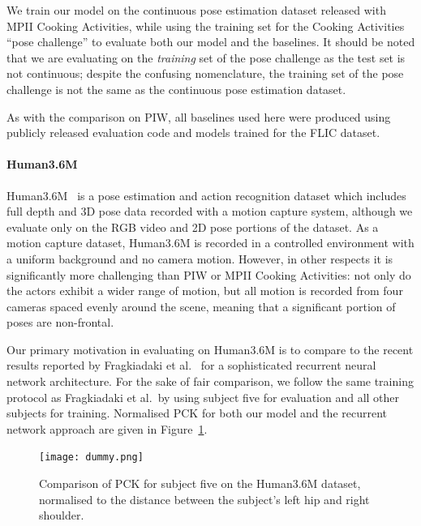 \documentclass[runningheads]{llncs}
\begin{document}
We train our model on the continuous pose estimation dataset released with MPII
Cooking Activities, while using the training set for the Cooking Activities
``pose challenge'' to evaluate both our model and the baselines. It should be
noted that we are evaluating on the \textit{training} set of the pose challenge
as the test set is not continuous; despite the confusing nomenclature, the
training set of the pose challenge is not the same as the continuous pose
estimation dataset.

As with the comparison on PIW, all baselines used here were
produced using publicly released evaluation code and models trained for the FLIC
dataset.

\paragraph{Human3.6M} Human3.6M~\cite{ionescu2014human,ionescu2011latent} is a
pose estimation and action recognition dataset which includes full depth and 3D
pose data recorded with a motion capture system, although we evaluate only on
the RGB video and 2D pose portions of the dataset. As a motion capture dataset,
Human3.6M is recorded in a controlled environment with a uniform background and
no camera motion. However, in other respects it is significantly more
challenging than PIW or MPII Cooking Activities: not only do the
actors exhibit a wider range of motion, but all motion is recorded from four
cameras spaced evenly around the scene, meaning that a significant portion of
poses are non-frontal.

Our primary motivation in evaluating on Human3.6M is to compare to the recent
results reported by Fragkiadaki et al.~\cite{fragkiadaki2015recurrent} for a
sophisticated recurrent neural network architecture. For the sake of fair
comparison, we follow the same training protocol as Fragkiadaki et al.\ by
using subject five for evaluation and all other subjects for training.
Normalised PCK for both our model and the recurrent network approach are given
in Figure~\ref{fig:h36m-pckh}.

\begin{figure}[t]
\begin{center}
\texttt{[image: dummy.png]}
\end{center}
\caption{Comparison of PCK for subject five on the Human3.6M dataset, normalised
to the distance between the subject's left hip and right shoulder.}
\label{fig:h36m-pckh}
\end{figure}
\end{document}
